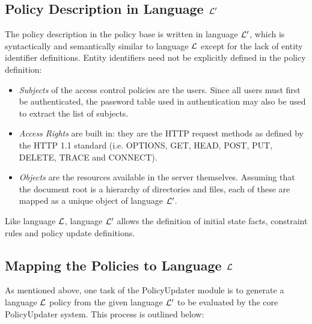 \documentclass[global,twocolumn,draft]{svjour}
\begin{document}
    \subsection{Policy Description in Language ${\cal L'}$}

      The policy description in the policy base is written in language
      ${\cal L'}$, which is syntactically and semantically similar to
      language ${\cal L}$ except for the lack of entity identifier
      definitions. Entity identifiers need not be explicitly defined in
      the policy definition:

      \begin{itemize}
        \item
          {\em Subjects} of the access control policies are the users. Since
          all users must first be authenticated, the password table used
          in authentication may also be used to extract the list of subjects.
        \item
          {\em Access Rights} are built in: they are the HTTP request methods
          as defined by the HTTP 1.1 standard \cite{HTTP1} (i.e. OPTIONS, GET,
          HEAD, POST, PUT, DELETE, TRACE and CONNECT).
        \item
          {\em Objects} are the resources available in the server themselves.
          Assuming that the document root is a hierarchy of directories and
          files, each of these are mapped as a unique object of language
          ${\cal L'}$.
      \end{itemize}

      Like language ${\cal L}$, language ${\cal L'}$ allows the definition of
      initial state facts, constraint rules and policy update definitions.

    \subsection{Mapping the Policies to Language ${\cal L}$}

      As mentioned above, one task of the PolicyUpdater module is to generate
      a language ${\cal L}$ policy from the given language ${\cal L'}$ to be
      evaluated by the core PolicyUpdater system. This process is outlined
      below:
\end{document}
